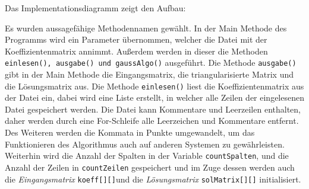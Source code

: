\documentclass[a4paper, 12pt]{report}
\begin{document}
Das Implementationsdiagramm zeigt den Aufbau: \newline
\begin{center}
{\ttfamily
{}
}

\end{center}
Es wurden aussagefähige Methodennamen gewählt.
In der Main Methode des Programms wird ein Parameter übernommen,
welcher die Datei mit der Koeffizientenmatrix annimmt. Außerdem werden
in dieser die Methoden \texttt{einlesen(), ausgabe() und gaussAlgo()} ausgeführt.
Die Methode \texttt{ausgabe()} gibt in der Main Methode die Eingangsmatrix, die triangularisierte Matrix
und die Lösungsmatrix aus. \newline
Die Methode \texttt{einlesen()} liest die Koeffizientenmatrix aus der Datei ein,
dabei wird eine Liste erstellt, in welcher alle Zeilen der eingelesenen Datei gespeichert werden.
Die Datei kann Kommentare und Leerzeilen enthalten, daher werden durch eine For-Schleife alle Leerzeichen und Kommentare entfernt.
Des Weiteren werden die Kommata in Punkte umgewandelt,
um das Funktionieren des Algorithmus auch auf anderen Systemen zu gewährleisten.
Weiterhin wird die Anzahl der Spalten in der Variable \texttt{countSpalten},
und die Anzahl der Zeilen in \texttt{countZeilen} gespeichert und
im Zuge dessen werden auch die \textit{Eingangsmatrix} \texttt{koeff[][]}und die \textit{Lösungsmatrix} \texttt{solMatrix[][]} initialisiert.
\end{document}
